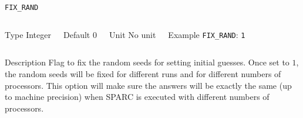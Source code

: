 %
%
%
%
%
%


\begin{frame}[allowframebreaks]{\texttt{FIX\_RAND}} \label{FIX_RAND}
\vspace*{-12pt}
\begin{columns}
\begin{block}{Type}
Integer
\end{block}

\begin{block}{Default}
0
\end{block}

\begin{block}{Unit}
No unit
\end{block}

\begin{block}{Example}
\texttt{FIX\_RAND}: \texttt{1}
\end{block}
\end{columns}

\begin{block}{Description}
Flag to fix the random seeds for setting initial guesses. Once set to $1$, the random seeds will be fixed for different runs and for different numbers of processors. This option will make sure the answers will be exactly the same (up to machine precision) when SPARC is executed with different numbers of processors.
\end{block}

\end{frame}


